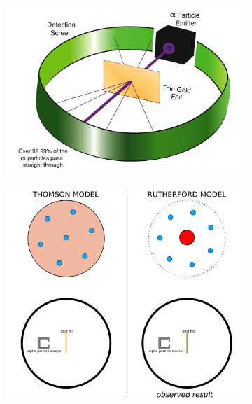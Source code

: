 \documentclass[12pt]{report}
\begin{document}
\begin{figure}[ht]
	\centering
	\begin{subfigure}{0.5\textwidth}
		\centering
		\includegraphics[width=\linewidth]{gold-foil-experiment.png}
	\end{subfigure}%
	\begin{subfigure}{.5\textwidth}
		\centering
		\includegraphics[width=\linewidth]{assets/atom-model-comparison.png}
	\end{subfigure}
\end{figure}
\end{document}
